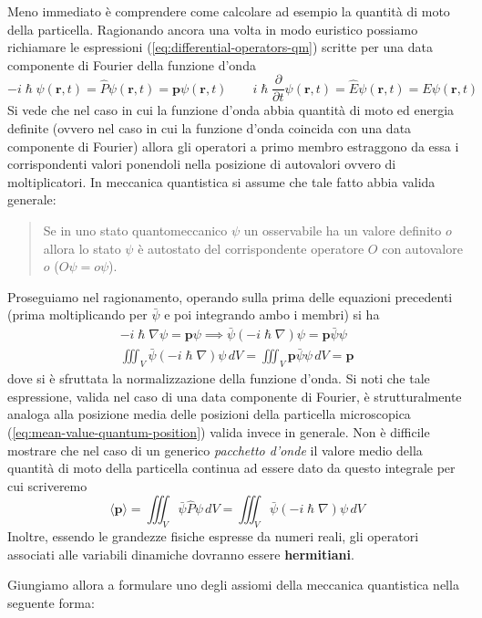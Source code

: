 Meno immediato è comprendere come calcolare ad esempio la quantità di
moto della particella.
Ragionando ancora una volta in modo euristico
possiamo richiamare le espressioni (\ref{eq:differential-operators-qm}) scritte per
una data componente di Fourier della funzione d'onda
\[
    - i \hslash \psi(\bm{r},t) = \hat{P} \psi(\bm{r},t) = \bm{p} \psi(\bm{r},t) \qquad
    i \hslash \frac{\partial}{\partial t} \psi(\bm{r},t) = \hat{E}\psi(\bm{r},t)= E\psi(\bm{r},t)
\] Si vede che nel caso in cui la funzione d'onda abbia quantità di moto
ed energia definite (ovvero nel caso in cui la funzione d'onda coincida
con una data componente di Fourier) allora gli operatori a primo membro
estraggono da essa i corrispondenti valori ponendoli nella posizione di
autovalori ovvero di moltiplicatori.
In meccanica quantistica si assume
che tale fatto abbia valida generale:
\begin{quote}
    Se in uno stato quantomeccanico \(\psi\) un osservabile ha un valore
    definito \(o\) allora lo stato \(\psi\) è autostato del corrispondente
    operatore \(O\) con autovalore \(o\) (\(O \psi = o \psi\)).
\end{quote}

Proseguiamo nel ragionamento, operando sulla prima delle equazioni
precedenti (prima moltiplicando per \(\bar{\psi}\) e poi integrando ambo i
membri) si ha
\begin{gather*}
    - i \hslash \nabla \psi = \bm{p} \psi \implies
    \bar{\psi}(-i \hslash \nabla) \psi = \bm{p} \bar{\psi}\psi\\
    \iiint_{V} \bar{\psi}(-i \hslash \nabla) \psi \, dV = \iiint_{V} \bm{p} \bar{\psi}\psi \, dV = \bm{p}
\end{gather*} dove si è sfruttata la normalizzazione della funzione d'onda.
Si noti
che tale espressione, valida nel caso di una data componente di Fourier,
è strutturalmente analoga alla posizione media delle posizioni della
particella microscopica (\ref{eq:mean-value-quantum-position}) valida invece in generale.
Non è difficile mostrare che nel caso di un generico \emph{pacchetto d'onde} il
valore medio della quantità di moto della particella continua ad essere
dato da questo integrale per cui scriveremo
\[
    \langle \bm{p}\rangle = \iiint_{V} \bar{\psi}\hat{P}\psi \, dV = \iiint_{V} \bar{\psi}(- i \hslash \nabla )\psi \, dV
\] Inoltre, essendo le grandezze fisiche espresse da numeri reali, gli
operatori associati alle variabili dinamiche dovranno essere
\textbf{hermitiani}.

Giungiamo allora a formulare uno degli assiomi della meccanica
quantistica nella seguente forma:

